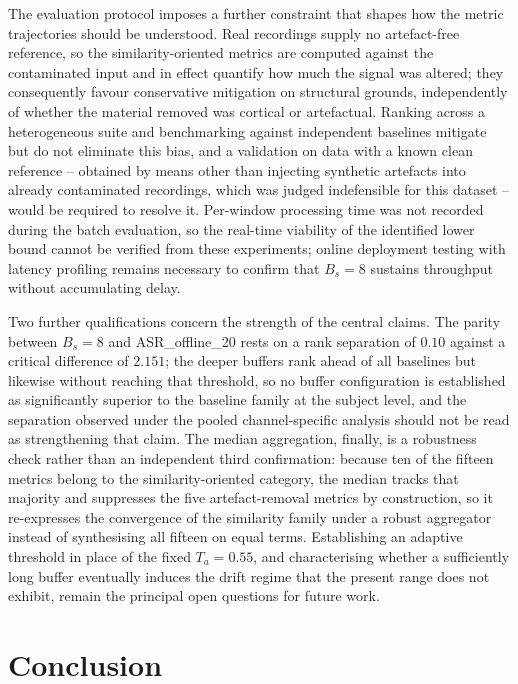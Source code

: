 \documentclass[MScCS,12pt,oneside,final]{uccthesis}
\begin{document}
The evaluation protocol imposes a further constraint that shapes how the metric trajectories should be understood. Real recordings supply no artefact-free reference, so the similarity-oriented metrics are computed against the contaminated input and in effect quantify how much the signal was altered; they consequently favour conservative mitigation on structural grounds, independently of whether the material removed was cortical or artefactual. Ranking across a heterogeneous suite and benchmarking against independent baselines mitigate but do not eliminate this bias, and a validation on data with a known clean reference -- obtained by means other than injecting synthetic artefacts into already contaminated recordings, which was judged indefensible for this dataset -- would be required to resolve it. Per-window processing time was not recorded during the batch evaluation, so the real-time viability of the identified lower bound cannot be verified from these experiments; online deployment testing with latency profiling remains necessary to confirm that $B_s = 8$ sustains
throughput without accumulating delay.

Two further qualifications concern the strength of the central claims. The parity between $B_s = 8$ and ASR\_offline\_20 rests on a rank separation of $0.10$ against a critical difference of $2.151$; the deeper buffers rank ahead of all baselines but likewise without reaching that threshold, so no buffer configuration is established as significantly superior to the baseline family at the subject level, and the separation observed under the pooled channel-specific analysis should not be read as strengthening that claim. The median aggregation, finally, is a robustness check rather than an independent third confirmation: because ten of the fifteen metrics belong to the similarity-oriented category, the median tracks that majority and suppresses the five artefact-removal metrics by construction, so it re-expresses the convergence of the similarity family under a robust aggregator instead of synthesising all fifteen on equal terms. Establishing an adaptive threshold in place of the fixed $T_a = 0.55$, and characterising whether a sufficiently long buffer eventually induces the drift regime that the present range does not exhibit, remain the principal open questions for future work.
\chapter{Conclusion}
\label{chap:conclusion}
\end{document}
